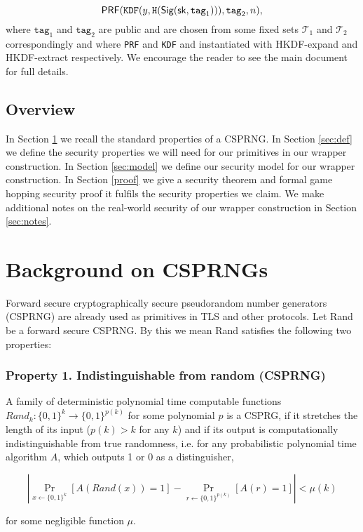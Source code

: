 \documentclass[12pt]{article}
\begin{document}
$$
\mathsf{PRF}(\texttt{KDF}(y, \texttt{H}(\mathsf{Sig} (\mathsf{sk}, \texttt{tag}_1))), \texttt{tag}_2, n),
$$
where $\texttt{tag}_1$ and $\texttt{tag}_2$ are public and are chosen
from some fixed sets $\mathcal{T}_1$ and $\mathcal{T}_2$ correspondingly and where \texttt{PRF} and \texttt{KDF} and instantiated with HKDF-expand and HKDF-extract respectively. We encourage the reader to see the main document for full details.

\subsection*{Overview}
In Section \ref{CSPRNG} we recall the standard properties of a CSPRNG. In Section \ref{sec:def} we define the security properties we will need for our primitives in our wrapper construction. In Section \ref{sec:model} we define our security model for our wrapper construction. In Section \ref{proof} we give a security theorem and formal game hopping security proof it fulfils the security properties we claim. We make additional notes on the real-world security of our wrapper construction in Section \ref{sec:notes}.


\section{Background on CSPRNGs} \label{CSPRNG}
Forward secure cryptographically secure pseudorandom number generators (CSPRNG) are already used as primitives in TLS and other protocols. Let Rand be a forward secure CSPRNG. By this we mean Rand satisfies the following two properties:

\subsubsection*{Property 1. Indistinguishable from random (CSPRNG)}

A family of deterministic polynomial time computable functions $Rand_{k} \colon \{0, 1\}^{k} \rightarrow \{0, 1 \}^{p(k)}$ for some polynomial $p$ is a  CSPRG, if it stretches the length of its input ($p(k) > k$ for any $k$) and if its output is computationally indistinguishable from true randomness, i.e. for any probabilistic polynomial time algorithm $A$, which outputs 1 or 0 as a distinguisher,

$$ |\Pr_{x\gets\{0,1\}^k}[A(Rand(x))=1] - \Pr_{r\gets\{0,1\}^{p(k)}}[A(r)=1]| < \mu(k) $$

\noindent for some negligible function $\mu$.
\end{document}
